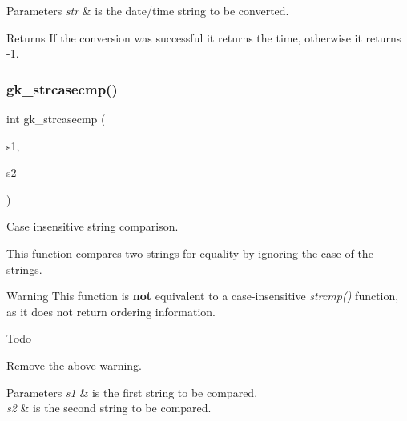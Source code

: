 \begin{DoxyParams}{Parameters}
{\em str} & is the date/time string to be converted. \\
\hline
\end{DoxyParams}
\begin{DoxyReturn}{Returns}
If the conversion was successful it returns the time, otherwise it returns -\/1. 
\end{DoxyReturn}
\mbox{\label{a00143_a47570da67818e57e97fdd464bc60fbd1}} 
\subsubsection{\texorpdfstring{gk\+\_\+strcasecmp()}{gk\_strcasecmp()}}
{\footnotesize\ttfamily int gk\+\_\+strcasecmp (\begin{DoxyParamCaption}\item[{char $\ast$}]{s1,  }\item[{char $\ast$}]{s2 }\end{DoxyParamCaption})}



Case insensitive string comparison. 

This function compares two strings for equality by ignoring the case of the strings.

\begin{DoxyWarning}{Warning}
This function is {\bfseries not} equivalent to a case-\/insensitive {\itshape strcmp()} function, as it does not return ordering information.
\end{DoxyWarning}
\begin{DoxyRefDesc}{Todo}
\item[\hyperlink{a00626__todo000001}{Todo}]Remove the above warning.\end{DoxyRefDesc}



\begin{DoxyParams}{Parameters}
{\em s1} & is the first string to be compared. \\
\hline
{\em s2} & is the second string to be compared. \\
\hline
\end{DoxyParams}

